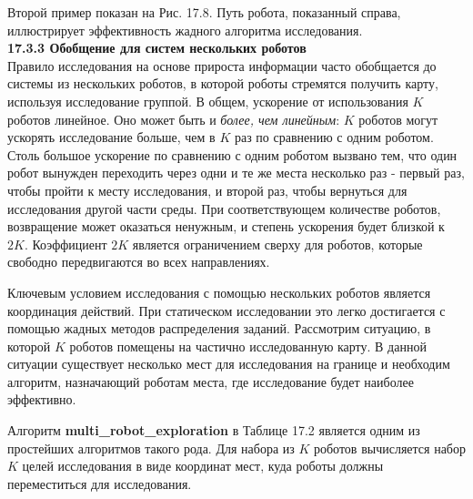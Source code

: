 \documentclass[10pt,a4paper]{article}
\begin{document}
Второй пример показан на Рис. 17.8. Путь робота, показанный справа, иллюстрирует эффективность жадного алгоритма исследования.\\

\textbf{17.3.3	Обобщение для систем нескольких роботов}\\

Правило исследования на основе прироста информации часто обобщается до системы из нескольких роботов, в которой роботы стремятся получить карту, используя исследование группой. В общем, ускорение от использования $K$ роботов линейное. Оно может быть и \textit{более, чем линейным}: $K$ роботов могут ускорять исследование больше, чем в $K$ раз по сравнению с одним роботом. Столь большое ускорение по сравнению с одним роботом вызвано тем, что один робот вынужден переходить через одни и те же места несколько раз - первый раз, чтобы пройти к месту исследования, и второй раз, чтобы вернуться для исследования другой части среды. При соответствующем количестве роботов, возвращение может оказаться ненужным, и степень ускорения будет близкой к $2K$. Коэффициент $2K$ является ограничением сверху для роботов, которые свободно передвигаются во всех направлениях.

Ключевым условием исследования с помощью нескольких роботов является координация действий. При статическом исследовании это легко достигается с помощью жадных методов распределения заданий. Рассмотрим ситуацию, в которой $K$ роботов помещены на частично исследованную карту. В данной ситуации существует несколько мест для исследования на границе и необходим алгоритм, назначающий роботам места, где исследование будет наиболее эффективно.

Алгоритм \textbf{multi\_robot\_exploration} в Таблице 17.2 является одним из простейших алгоритмов такого рода. Для набора из $K$ роботов вычисляется набор $K$ целей исследования в виде координат мест, куда роботы должны переместиться для исследования.
\end{document}
